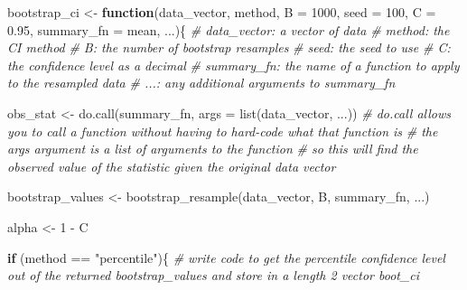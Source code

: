 \documentclass[
]{article}
\newenvironment{Shaded}{\begin{snugshade}}{\end{snugshade}}
\newcommand{\AttributeTok}[1]{\textcolor[rgb]{0.77,0.63,0.00}{#1}}
\newcommand{\CommentTok}[1]{\textcolor[rgb]{0.56,0.35,0.01}{\textit{#1}}}
\newcommand{\ControlFlowTok}[1]{\textcolor[rgb]{0.13,0.29,0.53}{\textbf{#1}}}
\newcommand{\DecValTok}[1]{\textcolor[rgb]{0.00,0.00,0.81}{#1}}
\newcommand{\FloatTok}[1]{\textcolor[rgb]{0.00,0.00,0.81}{#1}}
\newcommand{\FunctionTok}[1]{\textcolor[rgb]{0.00,0.00,0.00}{#1}}
\newcommand{\NormalTok}[1]{#1}
\newcommand{\OtherTok}[1]{\textcolor[rgb]{0.56,0.35,0.01}{#1}}
\newcommand{\SpecialCharTok}[1]{\textcolor[rgb]{0.00,0.00,0.00}{#1}}
\newcommand{\StringTok}[1]{\textcolor[rgb]{0.31,0.60,0.02}{#1}}
\begin{document}
\begin{Shaded}
\begin{Highlighting}[]
\NormalTok{bootstrap\_ci }\OtherTok{\textless{}{-}} \ControlFlowTok{function}\NormalTok{(data\_vector, method, }\AttributeTok{B =} \DecValTok{1000}\NormalTok{, }\AttributeTok{seed =} \DecValTok{100}\NormalTok{, }\AttributeTok{C =} \FloatTok{0.95}\NormalTok{, }\AttributeTok{summary\_fn =}\NormalTok{ mean, ...)\{}
  \CommentTok{\# data\_vector: a vector of data}
  \CommentTok{\# method: the CI method}
  \CommentTok{\# B: the number of bootstrap resamples}
  \CommentTok{\# seed: the seed to use}
  \CommentTok{\# C: the confidence level as a decimal}
  \CommentTok{\# summary\_fn: the name of a function to apply to the resampled data}
  \CommentTok{\# ...: any additional arguments to summary\_fn}


  
\NormalTok{  obs\_stat }\OtherTok{\textless{}{-}} \FunctionTok{do.call}\NormalTok{(summary\_fn, }\AttributeTok{args =} \FunctionTok{list}\NormalTok{(data\_vector, ...))}
  \CommentTok{\# do.call allows you to call a function without having to hard{-}code what that function is}
  \CommentTok{\# the args argument is a list of arguments to the function}
  \CommentTok{\# so this will find the observed value of the statistic given the original data vector}
  
\NormalTok{  bootstrap\_values }\OtherTok{\textless{}{-}} \FunctionTok{bootstrap\_resample}\NormalTok{(data\_vector, B, summary\_fn, ...)}
  
\NormalTok{  alpha }\OtherTok{\textless{}{-}} \DecValTok{1} \SpecialCharTok{{-}}\NormalTok{ C}
  
  \ControlFlowTok{if}\NormalTok{ (method }\SpecialCharTok{==} \StringTok{"percentile"}\NormalTok{)\{}
      \CommentTok{\# write code to get the percentile confidence level out of the returned bootstrap\_values and store in a length 2 vector boot\_ci}
    

\end{Highlighting}
\end{Shaded}
\end{document}
